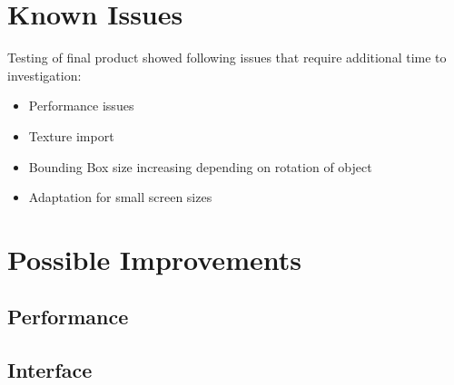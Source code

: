 \documentclass[12pt]{article}
\begin{document}
\section{Known Issues}
Testing of final product showed following issues that require additional time to investigation:
\begin{itemize}
\item Performance issues
\item Texture import
\item Bounding Box size increasing depending on rotation of object
\item Adaptation for small screen sizes
\end{itemize}

\newpage
\section{Possible Improvements}
\subsection{Performance}
\subsection{Interface}


\newpage


\end{document}
